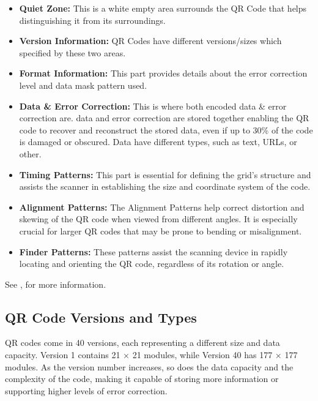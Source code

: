 \begin{itemize}
\item \textbf{Quiet Zone:}
This is a white empty area surrounds the QR Code that helps distinguishing it from its surroundings.

\item \textbf{Version Information:} QR Codes have different versions/sizes which specified by these two areas.

\item \textbf{Format Information:}
This part provides details about the error correction level and data mask pattern used.

\item \textbf{Data \& Error Correction:}
This is where both encoded data \& error correction are. data and error correction are stored together enabling the QR code to recover and reconstruct the stored data, even if up to 30\% of the code is damaged or obscured. Data have different types, such as text, URLs, or other. 

\item \textbf{Timing Patterns:}
This part is essential for defining the grid's structure and assists the scanner in establishing the size and coordinate system of the code.

\item \textbf{Alignment Patterns:}
The Alignment Patterns help correct distortion and skewing of the QR code when viewed from different angles. It is especially crucial for larger QR codes that may be prone to bending or misalignment.

\item \textbf{Finder Patterns:}
These patterns assist the scanning device in rapidly locating and orienting the QR code, regardless of its rotation or angle.
\end{itemize}

See \cite{Tiwari2016}, for more information.

\subsection{QR Code Versions and Types}
QR codes come in 40 versions, each representing a different size and data capacity. Version 1 contains 21 × 21 modules, while Version 40 has 177 × 177 modules. As the version number increases, so does the data capacity and the complexity of the code, making it capable of storing more information or supporting higher levels of error correction. 

